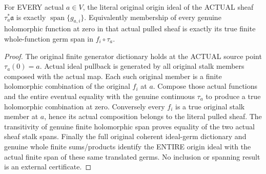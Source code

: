 \begin{theorem}
\label{hir:relative-normal-translated-jets-original-ideal-dictionary}
\leanok
{}
For EVERY actual $a\in V$, the literal original origin ideal of the ACTUAL
sheaf $\tau_a^*\mathfrak a$ is exactly
$\operatorname{span}\{g_{a,i}\}$. Equivalently membership of every genuine
holomorphic function at zero in that actual pulled sheaf is exactly its true
finite whole-function germ span in $f_i\circ\tau_a$.
\end{theorem}
\begin{proof}
The original finite generator dictionary holds at the ACTUAL source point
$\tau_a(0)=a$. Actual ideal pullback is generated by all original stalk
members composed with the actual map. Each such original member is a finite
holomorphic combination of the original $f_i$ at $a$. Compose those actual
functions and the entire eventual equality with the genuine continuous
$\tau_a$ to produce a true holomorphic combination at zero. Conversely every
$f_i$ is a true original stalk member at $a$, hence its actual composition
belongs to the literal pulled sheaf. The transitivity of genuine finite
holomorphic span proves equality of the two actual sheaf stalk spans.
Finally the full original coherent ideal-germ dictionary and genuine whole
finite sums/products identify the ENTIRE origin ideal with the actual finite
span of these same translated germs. No inclusion or spanning result is an
external certificate.
\end{proof}

